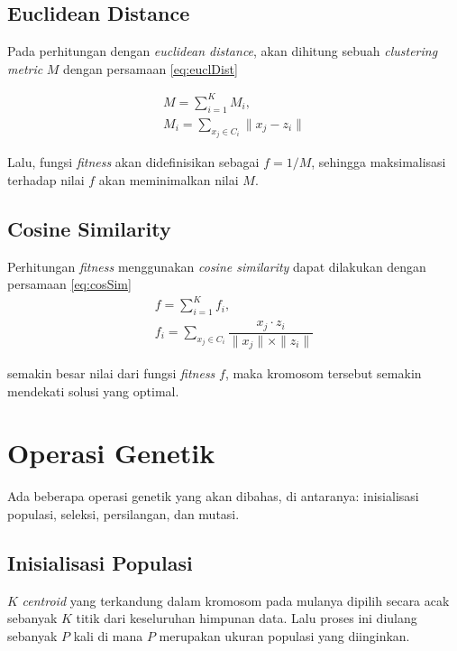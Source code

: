 \subsection{Euclidean Distance}
Pada perhitungan dengan \textit{euclidean distance}, akan dihitung sebuah \textit{clustering metric} $M$ dengan persamaan \ref{eq:euclDist}

\begin{equation}
\label{eq:euclDist}
	\begin{gathered}
	M=\sum_{i=1}^K M_i , \\
	M_i=\sum_{x_j\in C_i}\parallel x_j-z_i\parallel
	\end{gathered}
\end{equation}

Lalu, fungsi \textit{fitness} akan didefinisikan sebagai $f=1/M$, sehingga maksimalisasi terhadap nilai $f$ akan meminimalkan nilai $M$.

\subsection{Cosine Similarity}
Perhitungan \textit{fitness} menggunakan \textit{cosine similarity} dapat dilakukan dengan persamaan \ref{eq:cosSim}
\begin{equation}
\label{eq:cosSim}
	\begin{gathered}
	f=\sum_{i=1}^K f_i , \\
	f_i=\sum_{x_j\in C_i}\dfrac{x_j\cdot z_i}{\parallel x_j \parallel \times \parallel z_i \parallel}
	\end{gathered}
\end{equation}

semakin besar nilai dari fungsi \textit{fitness} $f$, maka kromosom tersebut semakin mendekati solusi yang optimal.

\section{Operasi Genetik}
Ada beberapa operasi genetik yang akan dibahas, di antaranya: inisialisasi populasi, seleksi, persilangan, dan mutasi.

\subsection{Inisialisasi Populasi}
$K$ \textit{centroid} yang terkandung dalam kromosom pada mulanya dipilih secara acak sebanyak $K$ titik dari keseluruhan himpunan data. Lalu proses ini diulang sebanyak $P$ kali di mana $P$ merupakan ukuran populasi yang diinginkan.

